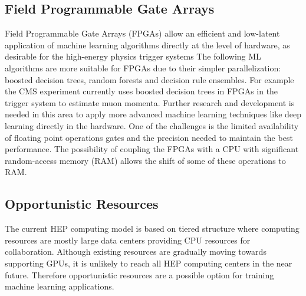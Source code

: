 \subsection{Field Programmable Gate Arrays}
Field Programmable Gate Arrays (FPGAs) allow an efficient and low-latent  application of machine learning algorithms directly at the level of hardware, as desirable for the high-energy physics trigger systems The following ML algorithms are more suitable for FPGAs due to their simpler parallelization: boosted decision trees, random forests and decision rule ensembles. For example the CMS experiment currently uses boosted decision trees in FPGAs in the trigger system to estimate muon momenta. Further research and development is needed in this area to apply more advanced machine learning techniques like deep learning directly in the hardware. One of the challenges is the limited availability of floating point operations gates and the precision needed to maintain the best performance. The possibility of coupling the FPGAs with a CPU with significant random-access memory (RAM) allows the shift of some of these operations to RAM.


\subsection{Opportunistic Resources}
The current HEP computing model is based on tiered structure where computing resources are mostly large data centers providing CPU resources for collaboration. Although existing resources are gradually moving towards supporting GPUs, it is unlikely to reach all HEP computing centers in the near future. Therefore opportunistic resources are a possible option for training machine learning applications.


